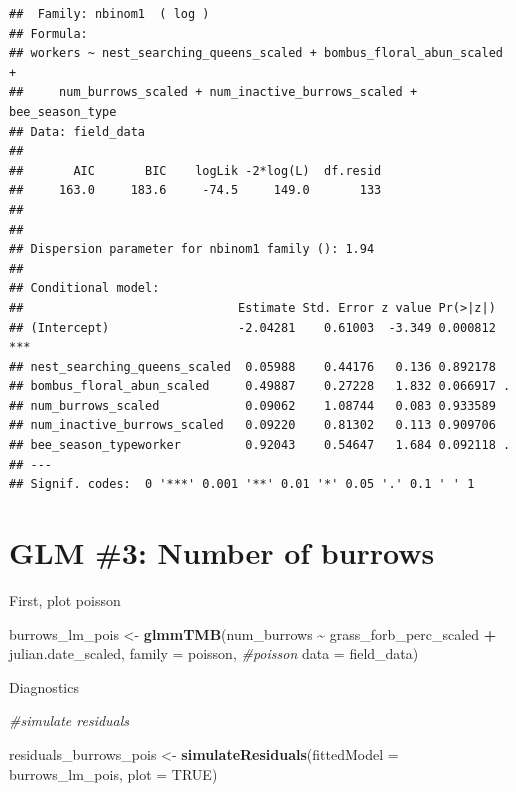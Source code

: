 \documentclass[
]{article}
\newenvironment{Shaded}{\begin{snugshade}}{\end{snugshade}}
\newcommand{\AttributeTok}[1]{\textcolor[rgb]{0.13,0.29,0.53}{#1}}
\newcommand{\CommentTok}[1]{\textcolor[rgb]{0.56,0.35,0.01}{\textit{#1}}}
\newcommand{\ConstantTok}[1]{\textcolor[rgb]{0.56,0.35,0.01}{#1}}
\newcommand{\FunctionTok}[1]{\textcolor[rgb]{0.13,0.29,0.53}{\textbf{#1}}}
\newcommand{\NormalTok}[1]{#1}
\newcommand{\OtherTok}[1]{\textcolor[rgb]{0.56,0.35,0.01}{#1}}
\newcommand{\SpecialCharTok}[1]{\textcolor[rgb]{0.81,0.36,0.00}{\textbf{#1}}}
\begin{document}
\begin{verbatim}
##  Family: nbinom1  ( log )
## Formula:          
## workers ~ nest_searching_queens_scaled + bombus_floral_abun_scaled +  
##     num_burrows_scaled + num_inactive_burrows_scaled + bee_season_type
## Data: field_data
## 
##       AIC       BIC    logLik -2*log(L)  df.resid 
##     163.0     183.6     -74.5     149.0       133 
## 
## 
## Dispersion parameter for nbinom1 family (): 1.94 
## 
## Conditional model:
##                              Estimate Std. Error z value Pr(>|z|)    
## (Intercept)                  -2.04281    0.61003  -3.349 0.000812 ***
## nest_searching_queens_scaled  0.05988    0.44176   0.136 0.892178    
## bombus_floral_abun_scaled     0.49887    0.27228   1.832 0.066917 .  
## num_burrows_scaled            0.09062    1.08744   0.083 0.933589    
## num_inactive_burrows_scaled   0.09220    0.81302   0.113 0.909706    
## bee_season_typeworker         0.92043    0.54647   1.684 0.092118 .  
## ---
## Signif. codes:  0 '***' 0.001 '**' 0.01 '*' 0.05 '.' 0.1 ' ' 1
\end{verbatim}

\section{GLM \#3: Number of burrows}\label{glm-3-number-of-burrows}

First, plot poisson

\begin{Shaded}
\begin{Highlighting}[]
\NormalTok{burrows\_lm\_pois }\OtherTok{\textless{}{-}} \FunctionTok{glmmTMB}\NormalTok{(num\_burrows }\SpecialCharTok{\textasciitilde{}}\NormalTok{ grass\_forb\_perc\_scaled }\SpecialCharTok{+} 
\NormalTok{                    julian.date\_scaled, }
                  \AttributeTok{family =}\NormalTok{ poisson, }\CommentTok{\#poisson}
                  \AttributeTok{data =}\NormalTok{ field\_data)}
\end{Highlighting}
\end{Shaded}

Diagnostics

\begin{Shaded}
\begin{Highlighting}[]
\CommentTok{\#simulate residuals}

\NormalTok{residuals\_burrows\_pois }\OtherTok{\textless{}{-}} \FunctionTok{simulateResiduals}\NormalTok{(}\AttributeTok{fittedModel =}\NormalTok{ burrows\_lm\_pois, }\AttributeTok{plot =} \ConstantTok{TRUE}\NormalTok{)}
\end{Highlighting}
\end{Shaded}
\end{document}

